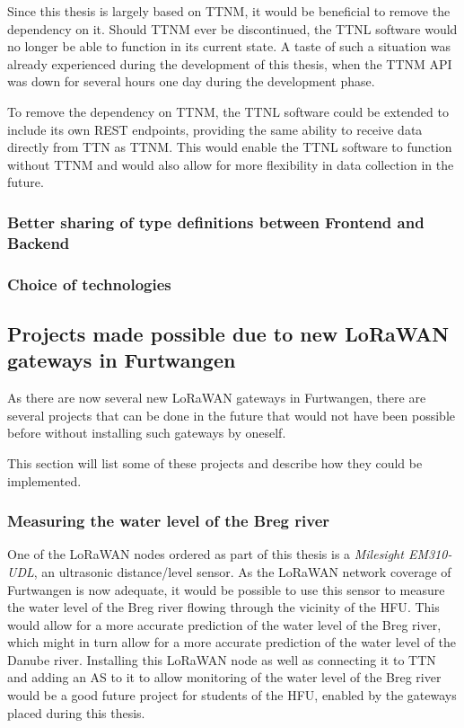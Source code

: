 Since this thesis is largely based on \ac{TTNM}, it would be beneficial to remove the dependency on it.
Should \ac{TTNM} ever be discontinued, the \ac{TTNL} software would no longer be able to function in its current state.
A taste of such a situation was already experienced during the development of this thesis, when the \ac{TTNM} \ac{API} was down for several hours one day during the development phase.

To remove the dependency on \ac{TTNM}, the \ac{TTNL} software could be extended to include its own \ac{REST} endpoints, providing the same ability to receive data directly from \ac{TTN} as \ac{TTNM}.
This would enable the \ac{TTNL} software to function without \ac{TTNM} and would also allow for more flexibility in data collection in the future.

\subsubsection{Better sharing of type definitions between Frontend and Backend}

\subsubsection{Choice of technologies}

\subsection{Projects made possible due to new \acs{LoRaWAN} gateways in Furtwangen}


As there are now several new \ac{LoRaWAN} gateways in Furtwangen, there are several projects that can be done in the future that would not have been possible before without installing such gateways by oneself.

This section will list some of these projects and describe how they could be implemented.

\subsubsection{Measuring the water level of the Breg river}

One of the \ac{LoRaWAN} nodes ordered as part of this thesis is a \emph{Milesight EM310-UDL}, an ultrasonic distance/level sensor.
As the \ac{LoRaWAN} network coverage of Furtwangen is now adequate, it would be possible to use this sensor to measure the water level of the Breg river flowing through the vicinity of the \ac{HFU}.
This would allow for a more accurate prediction of the water level of the Breg river, which might in turn allow for a more accurate prediction of the water level of the Danube river.
Installing this \ac{LoRaWAN} node as well as connecting it to \ac{TTN} and adding an \acf{AS} to it to allow monitoring of the water level of the Breg river would be a good future project for students of the \ac{HFU}, enabled by the gateways placed during this thesis.


